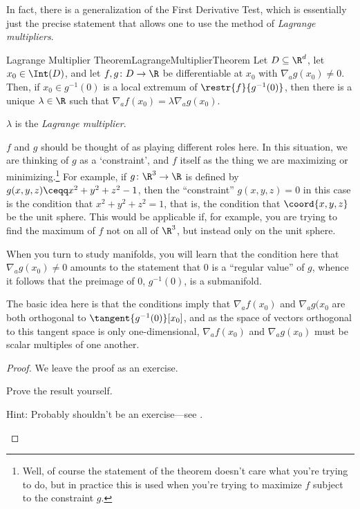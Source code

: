 In fact, there is a generalization of the First Derivative Test, which is essentially just the precise statement that allows one to use the method of \emph{Lagrange multipliers}.
\begin{thm}{Lagrange Multiplier Theorem}{LagrangeMultiplierTheorem}
Let $D\subseteq \R ^d$, let $x_0\in \Int (D)$, and let $f,g\colon D\rightarrow \R$ be differentiable at $x_0$ with $\nabla _ag(x_0)\neq 0$.  Then, if $x_0\in g^{-1}(0)$ is a local extremum of $\restr{f}{g^{-1}(0)}$, then there is a unique $\lambda \in \R$ such that $\nabla _af(x_0)=\lambda \nabla _ag(x_0)$.
\begin{rmk}
$\lambda$ is the \emph{Lagrange multiplier}.
\end{rmk}
\begin{rmk}
$f$ and $g$ should be thought of as playing different roles here.  In this situation, we are thinking of $g$ as a `constraint', and $f$ itself as the thing we are maximizing or minimizing.\footnote{Well, of course the statement of the theorem doesn't care what you're trying to do, but in practice this is used when you're trying to maximize $f$ subject to the constraint $g$.}  For example, if $g\colon \R ^3\rightarrow \R$ is defined by $g(x,y,z)\ceqq x^2+y^2+z^2-1$, then the ``constraint'' $g(x,y,z)=0$ in this case is the condition that $x^2+y^2+z^2=1$, that is, the condition that $\coord{x,y,z}$ be the unit sphere.  This would be applicable if, for example, you are trying to find the maximum of $f$ not on all of $\R ^3$, but instead only on the unit sphere.
\end{rmk}
\begin{rmk}
When you turn to study manifolds, you will learn that the condition here that $\nabla _ag(x_0)\neq 0$ amounts to the statement that $0$ is a ``regular value'' of $g$, whence it follows that the preimage of $0$, $g^{-1}(0)$, is a submanifold.
\end{rmk}
\begin{rmk}
The basic idea here is that the conditions imply that $\nabla _af(x_0)$ and $\nabla _ag(x_0$ are both orthogonal to $\tangent{g^{-1}(0)}[x_0]$, and as the space of vectors orthogonal to this tangent space is only one-dimensional, $\nabla _af(x_0)$ and $\nabla _ag(x_0)$ must be scalar multiples of one another.
\end{rmk}
\begin{proof}
We leave the proof as an exercise.
\begin{exr}{}{}
Prove the result yourself.
\begin{rmk}
Hint:  Probably shouldn't be an exercise---see \cite[Theorem 5.8.3]{Sally}.
\end{rmk}
\end{exr}
\end{proof}
\end{thm}
